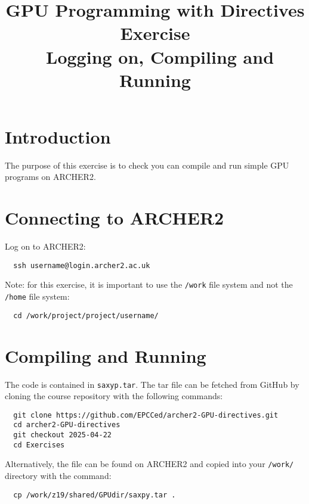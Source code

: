 \documentclass{article}
\begin{document}
\title{GPU Programming with Directives Exercise \\\
  Logging on, Compiling and Running}

\author{}
\date{}

\maketitle

\section{Introduction}

The purpose of this exercise is to check you can compile and run
simple GPU programs on ARCHER2.

\section{Connecting to ARCHER2}

Log on to ARCHER2:
\begin{verbatim}
  ssh username@login.archer2.ac.uk
\end{verbatim}

\noindent Note: for this exercise, it is important to use the \texttt{/work}
file system and not the \texttt{/home} file system:

\begin{verbatim}
  cd /work/project/project/username/
\end{verbatim}

\section{Compiling and Running}
The code is contained in \texttt{saxyp.tar}. The tar file can be fetched from GitHub by
cloning the course repository with the following commands:

\begin{verbatim}
  git clone https://github.com/EPCCed/archer2-GPU-directives.git
  cd archer2-GPU-directives
  git checkout 2025-04-22
  cd Exercises
\end{verbatim}

\noindent Alternatively, the file can be found on ARCHER2 and copied into your
\texttt{/work/} directory with the command:

\begin{verbatim}
  cp /work/z19/shared/GPUdir/saxpy.tar .
\end{verbatim}
\end{document}
